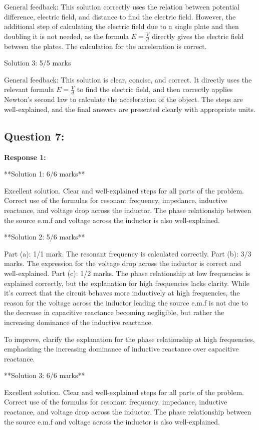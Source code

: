 \documentclass[a4paper,11pt]{article}
\begin{document}
General feedback: This solution correctly uses the relation between potential difference, electric field, and distance to find the electric field. However, the additional step of calculating the electric field due to a single plate and then doubling it is not needed, as the formula \( E = \frac{V}{d} \) directly gives the electric field between the plates. The calculation for the acceleration is correct.

Solution 3: 5/5 marks

General feedback: This solution is clear, concise, and correct. It directly uses the relevant formula \( E = \frac{V}{d} \) to find the electric field, and then correctly applies Newton's second law to calculate the acceleration of the object. The steps are well-explained, and the final answers are presented clearly with appropriate units.

\subsection*{Question 7:}

\textbf{Response 1:}

**Solution 1: 6/6 marks**

Excellent solution. Clear and well-explained steps for all parts of the problem. Correct use of the formulas for resonant frequency, impedance, inductive reactance, and voltage drop across the inductor. The phase relationship between the source e.m.f and voltage across the inductor is also well-explained.

**Solution 2: 5/6 marks**

Part (a): 1/1 mark. The resonant frequency is calculated correctly.
Part (b): 3/3 marks. The expression for the voltage drop across the inductor is correct and well-explained.
Part (c): 1/2 marks. The phase relationship at low frequencies is explained correctly, but the explanation for high frequencies lacks clarity. While it's correct that the circuit behaves more inductively at high frequencies, the reason for the voltage across the inductor leading the source e.m.f is not due to the decrease in capacitive reactance becoming negligible, but rather the increasing dominance of the inductive reactance.

To improve, clarify the explanation for the phase relationship at high frequencies, emphasizing the increasing dominance of inductive reactance over capacitive reactance.

**Solution 3: 6/6 marks**

Excellent solution. Clear and well-explained steps for all parts of the problem. Correct use of the formulas for resonant frequency, impedance, inductive reactance, and voltage drop across the inductor. The phase relationship between the source e.m.f and voltage across the inductor is also well-explained.
\end{document}
